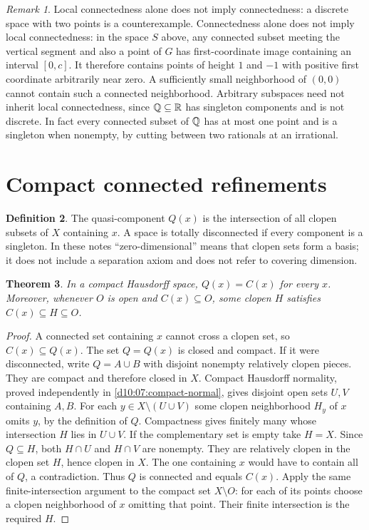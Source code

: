 \documentclass[11pt,oneside,openany]{book}
\newtheorem{theorem}{Theorem}[chapter]
\theoremstyle{definition}
\newtheorem{definition}[theorem]{Definition}
\theoremstyle{remark}
\newtheorem{remark}[theorem]{Remark}
\newcommand{\R}{\mathbb R}\newcommand{\C}{\mathbb C}
\begin{document}
\begin{remark}\label{d10:06:local-limitations}
Local connectedness alone does not imply connectedness: a discrete space with two points is a counterexample. Connectedness alone does not imply local connectedness: in the space $S$ above, any connected subset meeting the vertical segment and also a point of $G$ has first-coordinate image containing an interval $[0,c]$. It therefore contains points of height $1$ and $-1$ with positive first coordinate arbitrarily near zero. A sufficiently small neighborhood of $(0,0)$ cannot contain such a connected neighborhood. Arbitrary subspaces need not inherit local connectedness, since $\Q\subseteq\R$ has singleton components and is not discrete. In fact every connected subset of $\mathbb Q$ has at most one point and is a singleton when nonempty, by cutting between two rationals at an irrational.
\end{remark}

\section{Compact connected refinements}
\begin{definition}\label{d10:06:quasicomponent}
The quasi-component $Q(x)$ is the intersection of all clopen subsets of $X$ containing $x$. A space is totally disconnected if every component is a singleton. In these notes ``zero-dimensional'' means that clopen sets form a basis; it does not include a separation axiom and does not refer to covering dimension.
\end{definition}

\begin{theorem}\label{d10:06:quasicomponent-compact}
In a compact Hausdorff space, $Q(x)=C(x)$ for every $x$. Moreover, whenever $O$ is open and $C(x)\subseteq O$, some clopen $H$ satisfies $C(x)\subseteq H\subseteq O$.
\end{theorem}
\begin{proof}
A connected set containing $x$ cannot cross a clopen set, so $C(x)\subseteq Q(x)$. The set $Q=Q(x)$ is closed and compact. If it were disconnected, write $Q=A\cup B$ with disjoint nonempty relatively clopen pieces. They are compact and therefore closed in $X$. Compact Hausdorff normality, proved independently in \cref{d10:07:compact-normal}, gives disjoint open sets $U,V$ containing $A,B$. For each $y\in X\setminus(U\cup V)$ some clopen neighborhood $H_y$ of $x$ omits $y$, by the definition of $Q$. Compactness gives finitely many whose intersection $H$ lies in $U\cup V$. If the complementary set is empty take $H=X$. Since $Q\subseteq H$, both $H\cap U$ and $H\cap V$ are nonempty. They are relatively clopen in the clopen set $H$, hence clopen in $X$. The one containing $x$ would have to contain all of $Q$, a contradiction. Thus $Q$ is connected and equals $C(x)$. Apply the same finite-intersection argument to the compact set $X\setminus O$: for each of its points choose a clopen neighborhood of $x$ omitting that point. Their finite intersection is the required $H$.
\end{proof}
\end{document}
